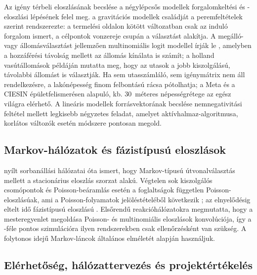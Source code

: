 \documentclass[12pt,a4paper]{article}
\theoremstyle{definition}
\theoremstyle{remark}
\begin{document}
Az igény térbeli eloszlásának becslése a négylépcsős modellek
forgalomkeltési és -eloszlási lépésének felel meg. \citet{wilson1971} a
gravitációs modellek családját a peremfeltételek szerint rendszerezte: a
termelési oldalon kötött változatban csak az induló forgalom ismert, a
célpontok vonzereje csupán a választást alakítja. A megálló- vagy
állomásválasztást jellemzően multinomiális logit modellel írják le
\citep{mcfadden1974}, amelyben a hozzáférési távolság mellett az állomás
kínálata is számít; \citet{debrezion2009} a holland vasútállomások példáján
mutatta meg, hogy az utasok a jobb kiszolgálású, távolabbi állomást is
választják. Ha sem utasszámláló, sem igénymátrix nem áll rendelkezésre, a
lakónépesség finom felbontású rácsa pótolhatja; a Meta és a CIESIN
épületfelismerésen alapuló, kb. $30$~méteres népességrétege
\citep{tiecke2017} az egész világra elérhető. A lineáris modellek
forrásvektorának becslése nemnegativitási feltétel mellett legkisebb
négyzetes feladat, amelyet \citet{lawson1974} aktívhalmaz-algoritmusa, korlátos
változók esetén \citet{stark1995} módszere pontosan megold.

\subsection{Markov-hálózatok és fázistípusú eloszlások}

\citet{jackson1957} nyílt sorbanállási hálózatai óta ismert, hogy Markov-típusú
útvonalválasztás mellett a stacionárius eloszlás szorzat alakú. Végtelen sok
kiszolgálós csomópontok és Poisson-beáramlás esetén a foglaltságok független
Poisson-eloszlásúak, ami a Poisson-folyamatok jelöléstételéből következik
\citep{kingman1993}; az elnyelődésig eltelt idő fázistípusú eloszlású
\citep{neuts1981}. Elsőrendű reakcióhálózatokra \citet{jahnke2007} megmutatta,
hogy a mesteregyenlet megoldása Poisson- és multinomiális eloszlások
konvolúciója, így a \citet{gillespie1977}-féle pontos szimulációra ilyen
rendszerekben csak ellenőrzésként van szükség. A folytonos idejű
Markov-láncok általános elméletét \citet{norris1997} alapján használjuk.

\subsection{Elérhetőség, hálózattervezés és projektértékelés}
\end{document}
